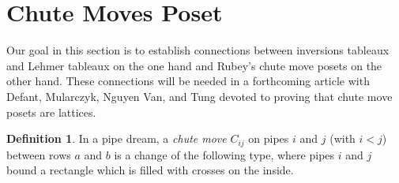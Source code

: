 \documentclass{article}
\theoremstyle{definition}
\newtheorem{definition}[theorem]{Definition} %
\begin{document}
\section{Chute Moves Poset}
\label{section:chute moves}

Our goal in this section is to establish connections between inversions tableaux and Lehmer tableaux on the one hand and Rubey's chute move posets on the other hand. These connections will be needed in a forthcoming article with Defant, Mularczyk, Nguyen Van, and Tung devoted to proving that chute move posets are lattices. 

\begin{definition}
\label{def: chute move}
    In a pipe dream, a \emph{chute move} $C_{ij}$ on pipes $i$ and $j$ (with $i<j$) between rows $a$ and $b$  is a change of the following type, where pipes $i$ and $j$ bound a rectangle which is filled with crosses on the inside.
    
\begin{center}
\end{center}
\end{definition}
\end{document}
